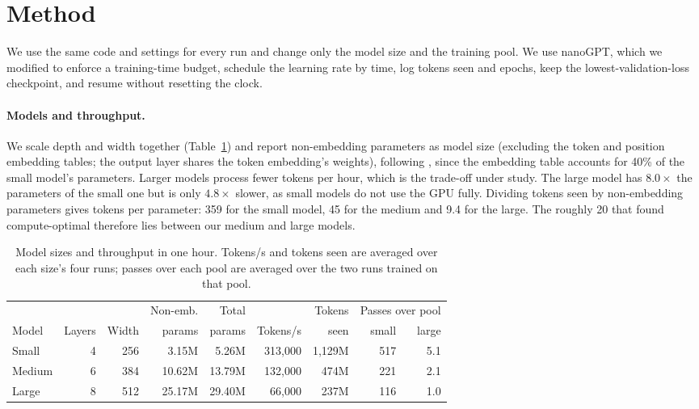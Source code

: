 \documentclass[12pt]{article}
\begin{document}
\section{Method}
\label{sec:method}

We use the same code and settings for every run and change only the model size and the training pool. We use nanoGPT, which we modified to enforce a training-time budget, schedule the learning rate by time, log tokens seen and epochs, keep the lowest-validation-loss checkpoint, and resume without resetting the clock.
 
\paragraph{Models and throughput.} We scale depth and width together (Table~\ref{tab:models}) and report non-embedding parameters as model size (excluding the token and position embedding tables; the output layer shares the token embedding's weights), following \citet{kaplan2020scaling}, since the embedding table accounts for 40\% of the small model's parameters. Larger models process fewer tokens per hour, which is the trade-off under study. The large model has $8.0\times$ the parameters of the small one but is only $4.8\times$ slower, as small models do not use the GPU fully. Dividing tokens seen by non-embedding parameters gives tokens per parameter: 359 for the small model, 45 for the medium and 9.4 for the large. The roughly 20 that \citet{hoffmann2022training} found compute-optimal therefore lies between our medium and large models.
 
\begin{table}[ht]
\centering
\small
\caption{Model sizes and throughput in one hour. Tokens/s and tokens seen are averaged over each size's four runs; passes over each pool are averaged over the two runs trained on that pool.}
\label{tab:models}
\begin{tabular}{lrrrrrrrr}
\toprule
 & & & Non-emb. & Total & & Tokens & \multicolumn{2}{c}{Passes over pool} \\
Model & Layers & Width & params & params & Tokens/s & seen & small & large \\
\midrule
Small  & 4 & 256 & 3.15M  & 5.26M  & 313,000 & 1,129M & 517 & 5.1 \\
Medium & 6 & 384 & 10.62M & 13.79M & 132,000 & 474M   & 221 & 2.1 \\
Large  & 8 & 512 & 25.17M & 29.40M & 66,000  & 237M   & 116 & 1.0 \\
\bottomrule
\end{tabular}
\end{table}
 
\end{document}
